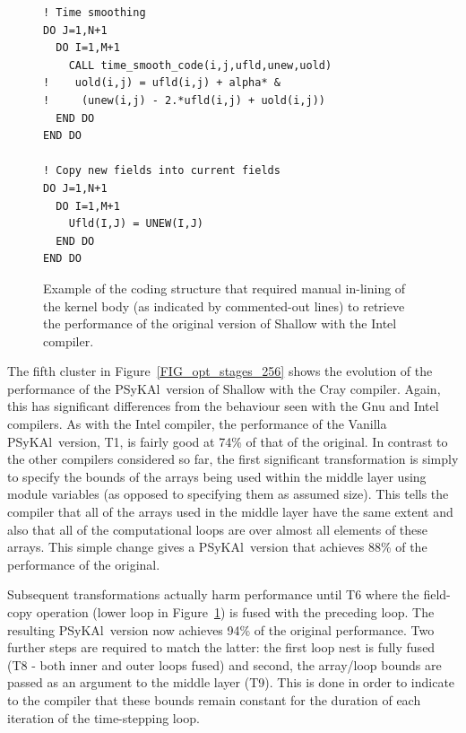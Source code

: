 \documentclass{IOS-Book-Article}
\newcommand{\psykal}{{PS}y{KA}l}
\begin{document}
\begin{figure}
\begin{verbatim}
! Time smoothing
DO J=1,N+1
  DO I=1,M+1
    CALL time_smooth_code(i,j,ufld,unew,uold)
!    uold(i,j) = ufld(i,j) + alpha* &
!     (unew(i,j) - 2.*ufld(i,j) + uold(i,j))
  END DO
END DO

! Copy new fields into current fields
DO J=1,N+1
  DO I=1,M+1
    Ufld(I,J) = UNEW(I,J)
  END DO
END DO
\end{verbatim}
\caption{Example of the coding structure that required manual
  in-lining of the kernel body (as indicated by commented-out lines)
  to retrieve the performance of the original version of Shallow with
  the Intel compiler.}
\label{FIG_time_smooth_code}
\end{figure}

The fifth cluster in Figure~\ref{FIG_opt_stages_256} shows the
evolution of the performance of the \psykal\ version of Shallow with
the Cray compiler. Again, this has significant differences from the
behaviour seen with the Gnu and Intel compilers. As with the Intel
compiler, the performance of the Vanilla \psykal\ version, T1,  is fairly
good at 74\% of that of the original. In contrast to the other
compilers considered so far, the first significant transformation is
simply to specify the bounds of the arrays being used within the
middle layer using module variables (as opposed to specifying them as
assumed size). This tells the compiler that all of the arrays used in
the middle layer have the same extent and also that all of the
computational loops are over almost all elements of these arrays. This
simple change gives a \psykal\ version that achieves 88\% of the
performance of the original.

Subsequent transformations actually harm performance until T6 where
the field-copy operation (lower loop in
Figure~\ref{FIG_time_smooth_code}) is fused with the preceding
loop. The resulting \psykal\ version now achieves 94\% of the original
performance. Two further steps are required to match the latter: the
first loop nest is fully fused (T8 - both inner and outer loops fused)
and second, the array/loop bounds are passed as an argument to the
middle layer (T9). This is done in order to indicate to the compiler
that these bounds remain constant for the duration of each iteration
of the time-stepping loop.
\end{document}
